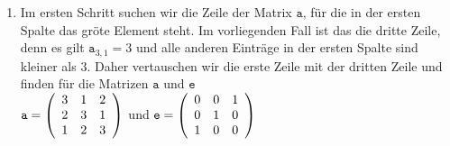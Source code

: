 \begin{enumerate}
\item Im ersten Schritt suchen wir die Zeile der Matrix $\mathtt{a}$, f\"{u}r die in der ersten Spalte
      das gr\"{o}\3te Element steht.  Im vorliegenden Fall ist das die dritte Zeile, denn es gilt $\mathtt{a}_{3,1} = 3$
      und alle anderen Eintr\"{a}ge in der ersten Spalte sind kleiner als $3$.  Daher vertauschen wir die
      erste Zeile mit der dritten Zeile und finden f\"{u}r die Matrizen $\mathtt{a}$ und $\mathtt{e}$
\\[0.2cm]
\hspace*{1.3cm}
$\mathtt{a} = \left(
  \begin{array}[c]{lll}
    3 & 1 & 2     \\
    2 & 3 & 1     \\
    1 & 2 & 3     
  \end{array}\right)
$ \quad und \quad
$\mathtt{e} = \left(
  \begin{array}[c]{lll}
    0 & 0 & 1     \\
    0 & 1 & 0     \\
    1 & 0 & 0            
  \end{array}\right)
$
\\[0.2cm]


\end{enumerate}
